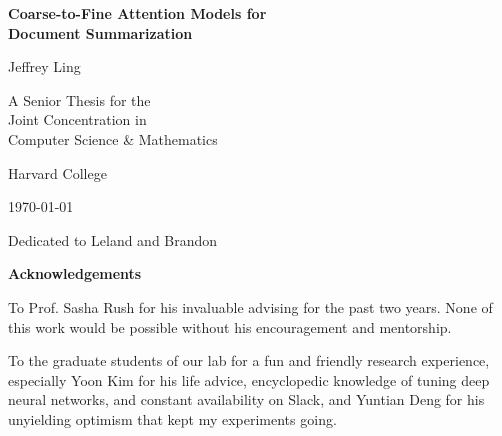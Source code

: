 \documentclass[12pt]{report}
\begin{document}


\begin{titlepage}
	\centering
	\vspace*{2cm}
	{\Huge\bfseries Coarse-to-Fine Attention Models for \\
				Document Summarization \par}
	\vfill
	{\LARGE Jeffrey Ling\par}
	\vspace{1cm}
	{\Large A Senior Thesis for the \\
		Joint Concentration in \\
	Computer Science \& Mathematics\par}
	\vspace{1cm}
	{\Large Harvard College\par}
	\vspace{1cm}
	{\Large \today }

	\vfill

\end{titlepage}
\onehalfspacing

\clearpage
\thispagestyle{empty}
\vspace*{4cm}
\begin{center}
 Dedicated to Leland and Brandon
\end{center}
\clearpage


\clearpage
\thispagestyle{empty}
\vspace*{2cm}
\begin{center}
\LARGE\bf Acknowledgements
\end{center}
\vspace{1cm}

To Prof. Sasha Rush for his invaluable advising for the past two years. None of this work would be possible without his encouragement and mentorship.

To the graduate students of our lab for a fun and friendly research experience, especially Yoon Kim for his life advice, encyclopedic knowledge of tuning deep neural networks, and constant availability on Slack,
and Yuntian Deng for his unyielding optimism that kept my experiments going.
\end{document}
